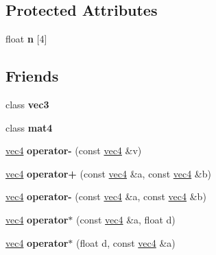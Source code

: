 \subsection*{Protected Attributes}
\begin{DoxyCompactItemize}
\item 
\hypertarget{classvec4_a6383f73ada3e8f541af128f892a36826}{float {\bfseries n} \mbox{[}4\mbox{]}}\label{classvec4_a6383f73ada3e8f541af128f892a36826}

\end{DoxyCompactItemize}
\subsection*{Friends}
\begin{DoxyCompactItemize}
\item 
\hypertarget{classvec4_aa849243c6cd858bbcd88237a8ad16cad}{class {\bfseries vec3}}\label{classvec4_aa849243c6cd858bbcd88237a8ad16cad}

\item 
\hypertarget{classvec4_a97061e9e921b7126184d68807056591e}{class {\bfseries mat4}}\label{classvec4_a97061e9e921b7126184d68807056591e}

\item 
\hypertarget{classvec4_ad251adce26c15c60b47175794dcee239}{\hyperlink{classvec4}{vec4} {\bfseries operator-\/} (const \hyperlink{classvec4}{vec4} \&v)}\label{classvec4_ad251adce26c15c60b47175794dcee239}

\item 
\hypertarget{classvec4_abbfa144d13bf5c0d487dd48b6ef95b68}{\hyperlink{classvec4}{vec4} {\bfseries operator+} (const \hyperlink{classvec4}{vec4} \&a, const \hyperlink{classvec4}{vec4} \&b)}\label{classvec4_abbfa144d13bf5c0d487dd48b6ef95b68}

\item 
\hypertarget{classvec4_a4e0631feb67b2a813523880ffa031c89}{\hyperlink{classvec4}{vec4} {\bfseries operator-\/} (const \hyperlink{classvec4}{vec4} \&a, const \hyperlink{classvec4}{vec4} \&b)}\label{classvec4_a4e0631feb67b2a813523880ffa031c89}

\item 
\hypertarget{classvec4_a787be96555ccf446839a4f58ff38398d}{\hyperlink{classvec4}{vec4} {\bfseries operator$\ast$} (const \hyperlink{classvec4}{vec4} \&a, float d)}\label{classvec4_a787be96555ccf446839a4f58ff38398d}

\item 
\hypertarget{classvec4_aeaf98615ceec75318547289733ff213c}{\hyperlink{classvec4}{vec4} {\bfseries operator$\ast$} (float d, const \hyperlink{classvec4}{vec4} \&a)}\label{classvec4_aeaf98615ceec75318547289733ff213c}


\end{DoxyCompactItemize}
